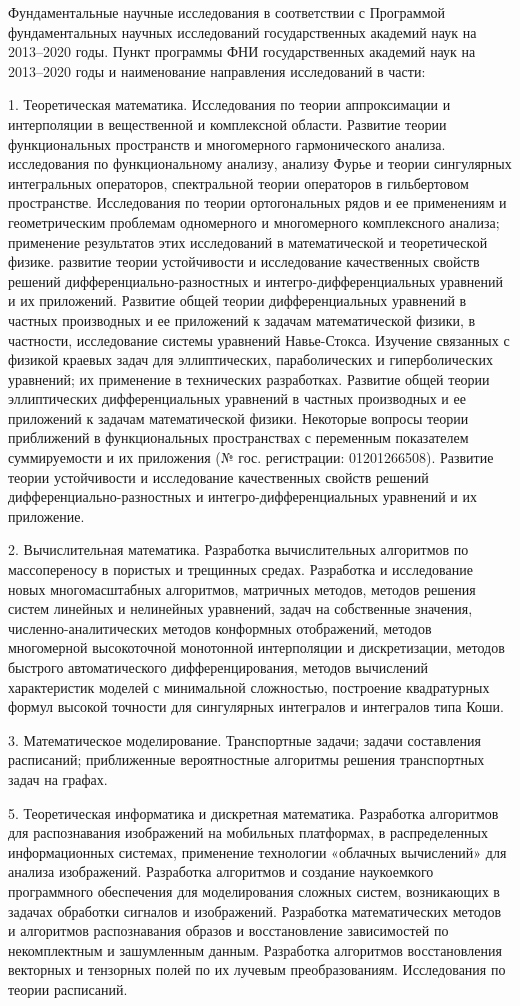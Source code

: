 Фундаментальные научные исследования в соответствии с Программой фундаментальных научных исследований государственных академий наук на 2013–2020 годы.
Пункт программы ФНИ государственных академий наук на 2013–2020 годы и наименование направления исследований в части:

1. Теоретическая математика. Исследования по теории аппроксимации и интерполяции в вещественной и комплексной области. Развитие теории функциональных пространств и многомерного гармонического анализа. исследования по функциональному анализу, анализу Фурье и теории сингулярных интегральных операторов, спектральной теории операторов в гильбертовом пространстве. Исследования по теории ортогональных рядов и ее применениям и геометрическим проблемам одномерного и многомерного комплексного анализа; применение результатов этих исследований в математической и теоретической физике. развитие теории устойчивости и исследование качественных свойств решений дифференциально-разностных и интегро-дифференциальных уравнений и их приложений. Развитие общей теории дифференциальных уравнений в частных производных и ее приложений к задачам математической физики, в частности, исследование системы уравнений Навье-Стокса. Изучение связанных с физикой краевых задач для эллиптических, параболических и гиперболических уравнений; их применение в технических разработках. Развитие общей теории эллиптических дифференциальных уравнений в частных производных и ее приложений к задачам математической физики. Некоторые вопросы теории приближений в функциональных пространствах с переменным показателем суммируемости и их приложения (№ гос. регистрации: 01201266508). Развитие теории устойчивости и исследование качественных свойств решений дифференциально-разностных и интегро-дифференциальных уравнений и их приложение.


2. Вычислительная математика. Разработка вычислительных алгоритмов по массопереносу в пористых и трещинных средах.
Разработка и исследование новых многомасштабных алгоритмов, матричных методов, методов решения систем линейных и нелинейных уравнений, задач на собственные значения, численно-аналитических методов конформных отображений, методов многомерной высокоточной монотонной интерполяции и дискретизации, методов быстрого автоматического дифференцирования, методов вычислений характеристик моделей с минимальной сложностью, построение квадратурных формул высокой точности для сингулярных интегралов и интегралов типа Коши.


3. Математическое моделирование. Транспортные задачи; задачи составления расписаний; приближенные вероятностные алгоритмы решения транспортных задач на графах.


5. Теоретическая информатика и дискретная математика. Разработка алгоритмов для распознавания изображений на мобильных платформах, в распределенных информационных системах, применение технологии «облачных вычислений» для анализа изображений. Разработка алгоритмов и создание наукоемкого программного обеспечения для моделирования сложных систем, возникающих в задачах обработки сигналов и изображений. Разработка математических методов и алгоритмов распознавания образов и восстановление зависимостей по некомплектным и зашумленным данным. Разработка алгоритмов восстановления векторных и тензорных полей по их лучевым преобразованиям. Исследования по теории расписаний. 